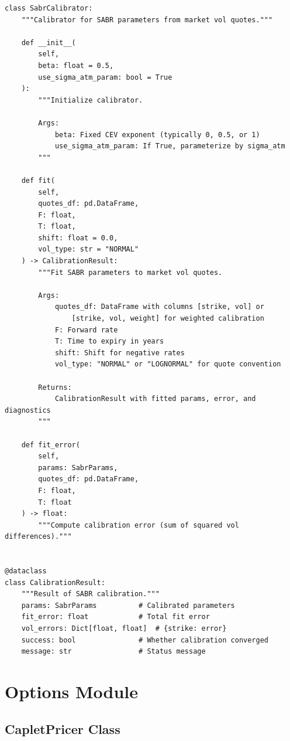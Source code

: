 \documentclass[12pt,a4paper]{report}
\begin{document}
\begin{lstlisting}
class SabrCalibrator:
    """Calibrator for SABR parameters from market vol quotes."""
    
    def __init__(
        self,
        beta: float = 0.5,
        use_sigma_atm_param: bool = True
    ):
        """Initialize calibrator.
        
        Args:
            beta: Fixed CEV exponent (typically 0, 0.5, or 1)
            use_sigma_atm_param: If True, parameterize by sigma_atm
        """
    
    def fit(
        self,
        quotes_df: pd.DataFrame,
        F: float,
        T: float,
        shift: float = 0.0,
        vol_type: str = "NORMAL"
    ) -> CalibrationResult:
        """Fit SABR parameters to market vol quotes.
        
        Args:
            quotes_df: DataFrame with columns [strike, vol] or
                [strike, vol, weight] for weighted calibration
            F: Forward rate
            T: Time to expiry in years
            shift: Shift for negative rates
            vol_type: "NORMAL" or "LOGNORMAL" for quote convention
            
        Returns:
            CalibrationResult with fitted params, error, and diagnostics
        """
    
    def fit_error(
        self,
        params: SabrParams,
        quotes_df: pd.DataFrame,
        F: float,
        T: float
    ) -> float:
        """Compute calibration error (sum of squared vol differences)."""


@dataclass
class CalibrationResult:
    """Result of SABR calibration."""
    params: SabrParams          # Calibrated parameters
    fit_error: float            # Total fit error
    vol_errors: Dict[float, float]  # {strike: error}
    success: bool               # Whether calibration converged
    message: str                # Status message
\end{lstlisting}

\section{Options Module}

\subsection{CapletPricer Class}
\end{document}
